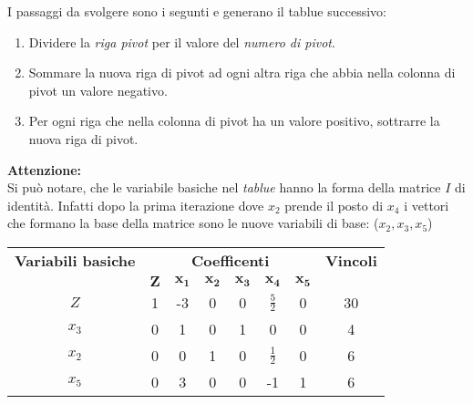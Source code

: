 \documentclass{article}
\begin{document}
I passaggi da svolgere sono i segunti e generano il tablue successivo:
\begin{enumerate}
  \item Dividere la \textit{riga pivot} per il valore del \textit{numero di pivot}.
  \item Sommare la nuova riga di pivot ad ogni altra riga che abbia nella colonna di pivot un valore negativo.
  \item Per ogni riga che nella colonna di pivot ha un valore positivo, sottrarre la nuova riga di pivot.
\end{enumerate}
\begin{tcolorbox}
  \textbf{Attenzione:} \\
  Si può notare, che le variabile basiche nel \textit{tablue} hanno la forma della matrice $I$ di identità. Infatti dopo la prima iterazione dove $x_2$ prende il posto di $x_4$ i vettori che formano la base della matrice sono le nuove variabili di base: ($x_2, x_3, x_5$)
\end{tcolorbox}

\begin{table}[h]
  \centering
  \begin{tabular}{|c|c|c|c|c|c|c|c|}
    \hline
    {\textbf{Variabili basiche}} & \multicolumn{6}{|c|}{\textbf{Coefficenti}} & \textbf{Vincoli}                                                                          \\
    \cline{1-8}
                                 & $\mathbf{Z}$                               & $\mathbf{x_1}$   & $\mathbf{x_2}$ & $\mathbf{x_3}$ & $\mathbf{x_4}$ & $\mathbf{x_5}$ &    \\
    \hline
    $Z$                          & 1                                          & -3               & 0              & 0              & $\frac{5}{2}$  & 0              & 30 \\
    $x_3$                        & 0                                          & 1                & 0              & 1              & 0              & 0              & 4  \\
    $x_2$                        & 0                                          & 0                & 1              & 0              & $\frac{1}{2}$  & 0              & 6  \\
    $x_5$                        & 0                                          & 3                & 0              & 0              & -1             & 1              & 6  \\
    \hline
  \end{tabular}
\end{table}
\end{document}

